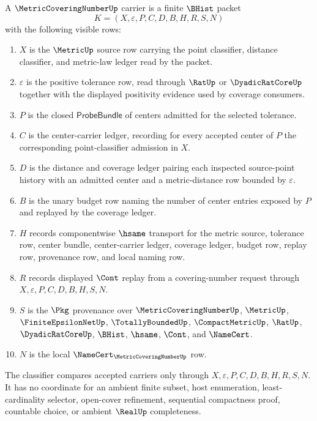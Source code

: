 \begin{definition}
\label{def:metric-covering-number-carrier}
A $\MetricCoveringNumberUp$ carrier is a finite $\BHist$ packet
$$
K=(X,\varepsilon,P,C,D,B,H,R,S,N)
$$
with the following visible rows:
\begin{enumerate}
\item $X$ is the $\MetricUp$ source row carrying the point classifier, distance classifier, and metric-law ledger read by the packet.
\item $\varepsilon$ is the positive tolerance row, read through $\RatUp$ or $\DyadicRatCoreUp$ together with the displayed positivity evidence used by coverage consumers.
\item $P$ is the closed $\mathsf{ProbeBundle}$ of centers admitted for the selected tolerance.
\item $C$ is the center-carrier ledger, recording for every accepted center of $P$ the corresponding point-classifier admission in $X$.
\item $D$ is the distance and coverage ledger pairing each inspected source-point history with an admitted center and a metric-distance row bounded by $\varepsilon$.
\item $B$ is the unary budget row naming the number of center entries exposed by $P$ and replayed by the coverage ledger.
\item $H$ records componentwise $\hsame$ transport for the metric source, tolerance row, center bundle, center-carrier ledger, coverage ledger, budget row, replay row, provenance row, and local naming row.
\item $R$ records displayed $\Cont$ replay from a covering-number request through $X,\varepsilon,P,C,D,B,H,S,N$.
\item $S$ is the $\Pkg$ provenance over $\MetricCoveringNumberUp$, $\MetricUp$, $\FiniteEpsilonNetUp$, $\TotallyBoundedUp$, $\CompactMetricUp$, $\RatUp$, $\DyadicRatCoreUp$, $\BHist$, $\hsame$, $\Cont$, and $\NameCert$.
\item $N$ is the local $\NameCert_{\MetricCoveringNumberUp}$ row.
\end{enumerate}
The classifier compares accepted carriers only through $X,\varepsilon,P,C,D,B,H,R,S,N$. It has no coordinate for an ambient finite subset, host enumeration, least-cardinality selector, open-cover refinement, sequential compactness proof, countable choice, or ambient $\RealUp$ completeness.
\end{definition}

